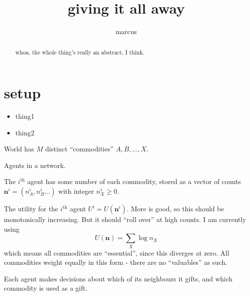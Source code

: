 \documentclass[11pt]{article}
\title{giving it all away}
\author{marcus}
\date{}
\begin{document}
\maketitle

\begin{abstract}
whoa, the whole thing's really an abstract, I think.
\end{abstract}

\section{setup}

\begin{itemize}
 \item thing1
 \item thing2
\end{itemize}

World has $M$ distinct ``commodities'' $A, B, \ldots, X$.

Agents in a network. 

The $i^\text{th}$ agent has some number of each commodity, stored as a
vector of counts $\mathbf{n}^i = (n^i_A, n^i_B \ldots )$ with integer
$n^i_X \geq 0$.

The utility for the $i^\text{th}$ agent $U^i = U(\mathbf{n}^i)$. More is good, so this should be monotonically increasing.
But it should ``roll over'' at high counts. I am currently using 
\[
U(\mathbf{n}) = \sum_X \log n_X
\]
which means all commodities are ``essential'', since this diverges at
zero.  All commodities weight equally in this form - there are no
``valuables'' as such.

Each agent makes decisions about which of its neighbours it gifts, and
which commodity is used as a gift.
\end{document}

